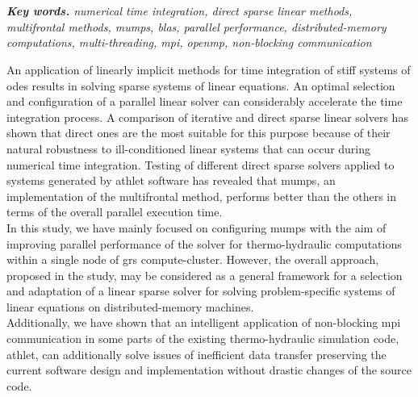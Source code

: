 \chapter{\abstractname}

\textit{\textbf{Key words.} numerical time integration, direct sparse linear methods, multifrontal methods, \acrshort{mumps}, \acrshort{blas}, parallel performance, distributed-memory computations,  multi-threading, \acrshort{mpi}, \acrshort{openmp}, non-blocking communication}

\vspace{10mm}



An application of linearly implicit methods for time integration of stiff systems of \acrshort{ode}s  results in solving sparse systems of linear equations. An optimal selection and configuration of a parallel linear solver can considerably accelerate the time integration process. A comparison of iterative and direct sparse linear solvers has shown that direct ones are the most suitable for this purpose because of their natural robustness to ill-conditioned linear systems that can occur during numerical time integration. Testing of different direct sparse solvers applied to systems generated by \acrshort{athlet} software has revealed that \acrshort{mumps}, an implementation of the multifrontal method, performs better than the others in terms of the overall parallel execution time.\\



In this study, we have mainly focused on configuring \acrshort{mumps} with the aim of improving parallel performance of the solver for thermo-hydraulic computations within a single node of \acrshort{grs} compute-cluster. However, the overall approach,  proposed in the study, may be considered as a general framework for a selection and adaptation of a linear sparse solver for solving problem-specific systems of linear equations on distributed-memory machines.\\


Additionally, we have shown that an intelligent application of non-blocking \acrshort{mpi} communication in some parts of the existing thermo-hydraulic simulation code, \acrshort{athlet}, can additionally solve issues of inefficient data transfer preserving the current software design and implementation without drastic changes of the source code.\\
